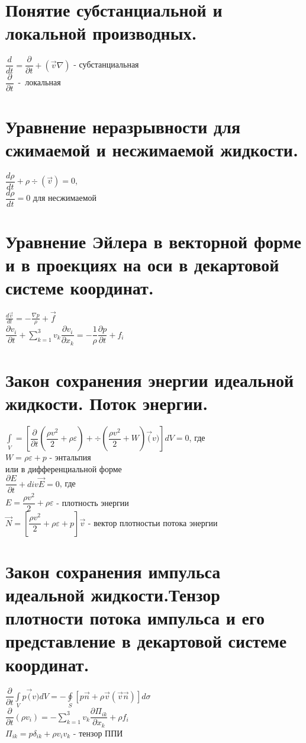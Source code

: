 

\newcommand{\sumk}{\sum\limits_{k=1}^3v_k}


	\small
	\begin{multicols*}{4}
		\section{Понятие субстанциальной и локальной производных.}
		$\dfrac{d}{dt}=\dfrac{\partial}{\partial t}+(\vec{v}\nabla)$ - субстанциальная \\
		$\dfrac{\partial}{\partial t}$~-~локальная
		
		\section{Уравнение неразрывности для сжимаемой и несжимаемой жидкости.}
		$\dfrac{d\rho}{dt}+\rho \div(\vec{v})=0$, \\
		$\dfrac{d\rho}{dt}=0$ для несжимаемой 
		
		\section{Уравнение Эйлера в векторной форме и в проекциях на оси в декартовой системе координат.}
		$\frac{d\vec{v}}{dt}=-\frac{\nabla p}{\rho}+\vec{f}$ \\
		$\dfrac{\partial v_i}{\partial t}+\sumk\dfrac{\partial v_i}{\partial x_k}=-\dfrac{1}{\rho}\dfrac{\partial p}{\partial t}+f_i$
		
		\section{Закон сохранения энергии идеальной жидкости. Поток энергии.}
		$\int\limits_V=\left[\dfrac{\partial}{\partial t}(\dfrac{\rho v^2}{2}+\rho\varepsilon)+\div(\dfrac{\rho v^2}{2}+W)\vec(v)\right]dV=0$, где\\
		$W=\rho\varepsilon+p$ - энтальпия \\
		или в дифференциальной форме \\
		$\dfrac{\partial E}{\partial t}+div\vec{E}=0$, где \\
		$E=\dfrac{\rho v^2}{2}+\rho\varepsilon$ - плотность энергии \\
		$\vec{N}=\left[\dfrac{\rho v^2}{2}+\rho\varepsilon+p\right]\vec{v}$ - вектор плотностьи потока энергии
		
		\section{Закон сохранения импульса идеальной жидкости.Тензор плотности потока импульса и его представление в декартовой системе координат.}
		$ \dfrac{\partial}{\partial t}\int\limits_V p\vec(v)dV=-\oint\limits_S \left[p\vec{n}+\rho\vec{v}(\vec{v}\vec{n})\right]d\sigma$ \\
		$ \dfrac{\partial}{\partial t}(\rho v_i)=-\sumk\dfrac{\partial \Pi_{ik}}{\partial x_k}+\rho f_i $ \\
		$ \Pi_{ik} = p\delta_{ik}+\rho v_iv_k$ - тензор ППИ
		

\end{multicols*}

